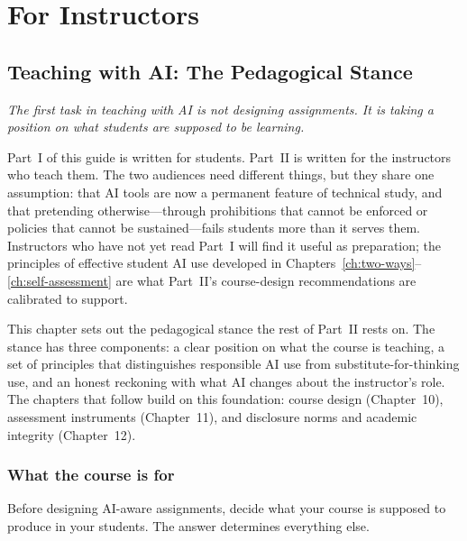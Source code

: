 \documentclass[11pt]{book}
\begin{document}
\part{For Instructors}

\chapter{Teaching with AI: The Pedagogical Stance}
\label{ch:pedagogical-stance}

\noindent \emph{The first task in teaching with AI is not designing assignments. It is taking a position on what students are supposed to be learning.}

\medskip

Part~I of this guide is written for students. Part~II is written for the instructors who teach them. The two audiences need different things, but they share one assumption: that AI tools are now a permanent feature of technical study, and that pretending otherwise---through prohibitions that cannot be enforced or policies that cannot be sustained---fails students more than it serves them. Instructors who have not yet read Part~I will find it useful as preparation; the principles of effective student AI use developed in Chapters~\ref{ch:two-ways}--\ref{ch:self-assessment} are what Part~II's course-design recommendations are calibrated to support.

This chapter sets out the pedagogical stance the rest of Part~II rests on. The stance has three components: a clear position on what the course is teaching, a set of principles that distinguishes responsible AI use from substitute-for-thinking use, and an honest reckoning with what AI changes about the instructor's role. The chapters that follow build on this foundation: course design (Chapter~10), assessment instruments (Chapter~11), and disclosure norms and academic integrity (Chapter~12).

\section{What the course is for}

Before designing AI-aware assignments, decide what your course is supposed to produce in your students. The answer determines everything else.
\end{document}
